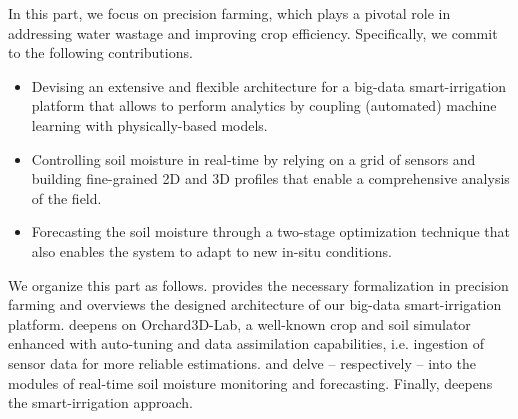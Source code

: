 In this part, we focus on precision farming, which plays a pivotal role in addressing water wastage and improving crop efficiency. Specifically, we commit to the following contributions.
\begin{itemize}
    \item Devising an extensive and flexible architecture for a big-data smart-irrigation platform that allows to perform analytics by coupling (automated) machine learning with physically-based models.
    \item Controlling soil moisture in real-time by relying on a grid of sensors and building fine-grained 2D and 3D profiles that enable a comprehensive analysis of the field.
    \item Forecasting the soil moisture through a two-stage optimization technique that also enables the system to adapt to new in-situ conditions.
\end{itemize}



We organize this part as follows.  provides the necessary formalization in precision farming and overviews the designed architecture of our big-data smart-irrigation platform.
 deepens on Orchard3D-Lab, a well-known crop and soil simulator enhanced with auto-tuning and data assimilation capabilities, i.e. ingestion of sensor data for more reliable estimations.
 and  delve -- respectively -- into the modules of real-time soil moisture monitoring and forecasting.
Finally,  deepens the smart-irrigation approach.